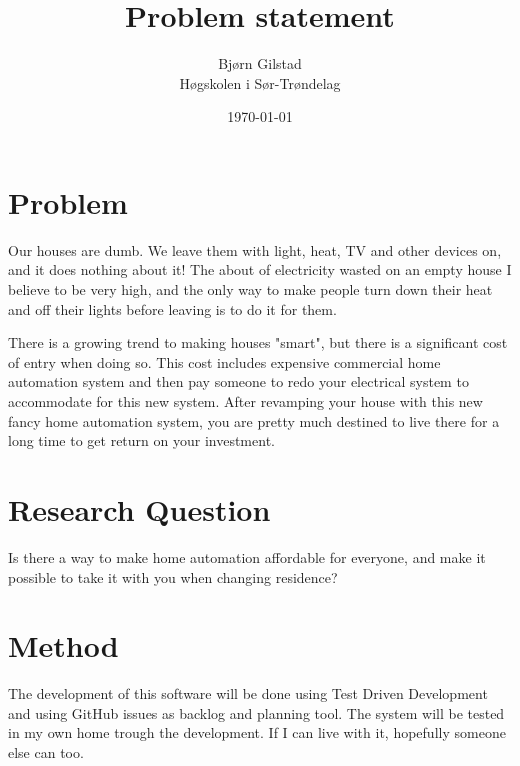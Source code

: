 \documentclass[12pt,norsk,a4paper]{article}
\title{Problem statement}
\author{
  Bjørn Gilstad \\
  Høgskolen i Sør-Trøndelag\\
}
\date{\today}
\begin{document}
\maketitle


\section{Problem}
Our houses are dumb. We leave them with light, heat, TV and other devices on, and it does nothing about
it! The about of electricity wasted on an empty house I believe to be very high, and the only way to
make people turn down their heat and off their lights before leaving is to do it for them.

There is a growing trend to making houses "smart", but there is a significant cost of entry when
doing so. This cost includes expensive commercial home automation system and then pay someone to
redo your electrical system to accommodate for this new system. After revamping your house with this
new fancy home automation system, you are pretty much destined to live there for a long time to get
return on your investment.

\section{Research Question}
Is there a way to make home automation affordable for everyone, and make it possible to take it with
you when changing residence?

\section{Method}
The development of this software will be done using Test Driven Development and using GitHub issues
as backlog and planning tool. The system will be tested in my own home trough the development. If I
can live with it, hopefully someone else can too.
\end{document}
